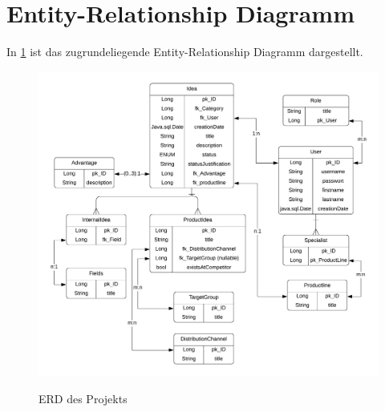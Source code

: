 

\section{Entity-Relationship Diagramm}

In \cref{fig:erd} ist das zugrundeliegende Entity-Relationship Diagramm dargestellt.

\begin{figure}[hbt]
    \centering
    \begin{minipage}[t]{1\textwidth}
        \caption{ERD des Projekts}
        \includegraphics[width=1\textwidth]{img/erd.png}\\
        \label{fig:erd}
    \end{minipage}
\end{figure}

